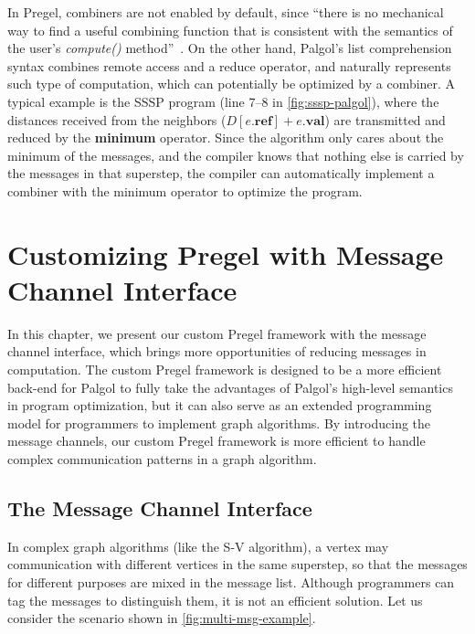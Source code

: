 \documentclass{sokendai_thesis} %
\begin{document}
In Pregel, combiners are not enabled by default, since ``there is no mechanical way to find a useful combining function that is consistent with the semantics of the user's \emph{compute()} method''~\cite{pregel}. %
On the other hand, Palgol's list comprehension syntax combines remote access and a reduce operator, and naturally represents such type of computation, which can potentially be optimized by a combiner.
A typical example is the SSSP program (line 7--8 in \autoref{fig:sssp-palgol}), where the distances received from the neighbors ($D[e.\mathbf{ref}]+e.\mathbf{val}$) are transmitted and reduced by the \textbf{minimum} operator.
Since the algorithm only cares about the minimum of the messages, and the compiler knows that nothing else is carried by the messages in that superstep, the compiler can automatically implement a combiner with the minimum operator to optimize the program.

\chapter{Customizing Pregel with Message Channel Interface}
\label{sec:custom}

In this chapter, we present our custom Pregel framework with the message channel interface, which brings more opportunities of reducing messages in computation.
The custom Pregel framework is designed to be a more efficient back-end for Palgol to fully take the advantages of Palgol's high-level semantics in program optimization, but it can also serve as an extended programming model for programmers to implement graph algorithms.
By introducing the message channels, our custom Pregel framework is more efficient to handle complex communication patterns in a graph algorithm.

\section{The Message Channel Interface}

In complex graph algorithms (like the S-V algorithm), a vertex may communication with different vertices in the same superstep, so that the messages for different purposes are mixed in the message list.
Although programmers can tag the messages to distinguish them, it is not an efficient solution.
Let us consider the scenario shown in \autoref{fig:multi-msg-example}.
\end{document}
